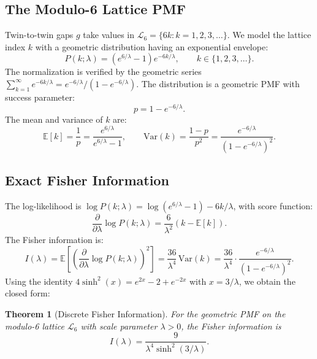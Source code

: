 \documentclass[11pt]{article}
\newtheorem{theorem}{Theorem}
\begin{document}
\subsection{The Modulo-6 Lattice PMF}
Twin-to-twin gaps $g$ take values in $\mathcal{L}_6 = \{6k : k = 1, 2, 3, \ldots\}$. We model the lattice index $k$ with a geometric distribution having an exponential envelope:
\begin{equation}
    P(k; \lambda) = \left(e^{6/\lambda} - 1\right) e^{-6k/\lambda}, \qquad k \in \{1, 2, 3, \ldots\}.
\end{equation}
The normalization is verified by the geometric series $\sum_{k=1}^\infty e^{-6k/\lambda} = e^{-6/\lambda}/(1 - e^{-6/\lambda})$. The distribution is a geometric PMF with success parameter:
\begin{equation}
    p = 1 - e^{-6/\lambda}.
\end{equation}
The mean and variance of $k$ are:
\begin{equation}
    \mathbb{E}[k] = \frac{1}{p} = \frac{e^{6/\lambda}}{e^{6/\lambda} - 1}, \qquad
    \text{Var}(k) = \frac{1-p}{p^2} = \frac{e^{-6/\lambda}}{(1 - e^{-6/\lambda})^2}.
\end{equation}

\subsection{Exact Fisher Information}
The log-likelihood is $\log P(k; \lambda) = \log(e^{6/\lambda} - 1) - 6k/\lambda$, with score function:
\begin{equation}
    \frac{\partial}{\partial \lambda} \log P(k; \lambda) = \frac{6}{\lambda^2}\left(k - \mathbb{E}[k]\right).
\end{equation}
The Fisher information is:
\begin{equation}
    I(\lambda) = \mathbb{E}\left[\left(\frac{\partial}{\partial \lambda} \log P(k; \lambda)\right)^2\right]
    = \frac{36}{\lambda^4}\,\text{Var}(k)
    = \frac{36}{\lambda^4} \cdot \frac{e^{-6/\lambda}}{(1 - e^{-6/\lambda})^2}.
\end{equation}
Using the identity $4\sinh^2(x) = e^{2x} - 2 + e^{-2x}$ with $x = 3/\lambda$, we obtain the closed form:

\begin{theorem}[Discrete Fisher Information]
For the geometric PMF on the modulo-6 lattice $\mathcal{L}_6$ with scale parameter $\lambda > 0$, the Fisher information is
\begin{equation}
    I(\lambda) = \frac{9}{\lambda^4 \sinh^2(3/\lambda)}.
\end{equation}
\end{theorem}
\end{document}

